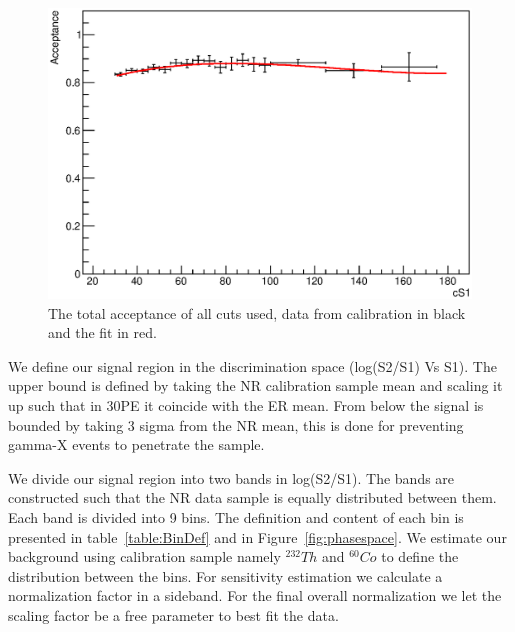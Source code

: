 \begin{figure}[h!]
\begin{minipage}{1.\linewidth}
\centerline{\includegraphics[width=1.\linewidth]{Figures/Acceptance.eps}}
\end{minipage}
\caption{The total acceptance of all cuts used, data from calibration in black and the fit in red.}
\label{fig:Acc}
\end{figure}

We define our signal region in the discrimination space (log(S2/S1) Vs S1). The upper bound is defined by taking the NR calibration sample mean and scaling it up such that in 30PE it coincide with the ER mean. From below the signal is bounded by taking 3 sigma from the NR mean, this is done for preventing gamma-X events to penetrate the sample. 

We divide our signal region into two bands in log(S2/S1). The bands are constructed such that the NR data sample is equally distributed between them. Each band is divided into 9 bins. The definition and content of each bin is presented in table~\ref{table:BinDef} and in Figure~\ref{fig:phasespace}. We estimate our background using calibration sample namely $^{232}Th$ and $^{60}Co$ to define the distribution between the bins. For sensitivity estimation we calculate a normalization factor in a sideband. For the final overall normalization we let the scaling factor be a free parameter to best fit the data.






